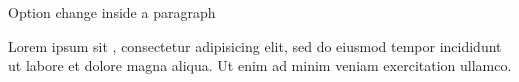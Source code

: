 \documentclass{article}
\begin{document}
{Option change inside a paragraph}


Lorem ipsum  sit
, consectetur adipisicing elit, sed do
eiusmod tempor incididunt ut labore et dolore magna aliqua. Ut enim ad
minim veniam exercitation ullamco.
\end{document}
